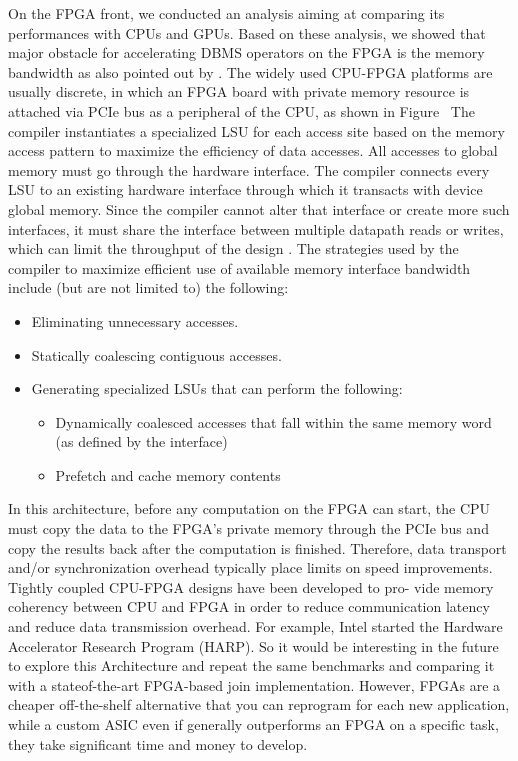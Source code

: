 \documentclass[sigconf, nonacm]{acmart}
\begin{document}
On the FPGA front, we conducted an analysis aiming at comparing its performances with CPUs and GPUs. Based on these analysis, we showed that major obstacle for accelerating DBMS operators on the FPGA is the memory bandwidth as also pointed out by \cite{Chen2020IsFU}. The widely used CPU-FPGA platforms are usually discrete, in which an FPGA board with private memory resource is attached via PCIe
bus as a peripheral of the CPU, as shown in Figure \
The compiler instantiates a specialized LSU for each access site based on the
memory access pattern to maximize the efficiency of data accesses.
All accesses to global memory must go through the hardware interface. The compiler
connects every LSU to an existing hardware interface through which it transacts with
device global memory. Since the compiler cannot alter that interface or create more
such interfaces, it must share the interface between multiple datapath reads or writes,
which can limit the throughput of the design \cite{fpga_optim}.
The strategies used by the compiler to
maximize efficient use of available memory interface bandwidth include (but are not
limited to) the following:
\begin{itemize}
    \item  Eliminating unnecessary accesses.
    \item Statically coalescing contiguous accesses.
    \item Generating specialized LSUs that can perform the following:
    \begin{itemize}
        \item Dynamically coalesced accesses that fall within the same memory word (as
defined by the interface)
\item Prefetch and cache memory contents
    \end{itemize}
\end{itemize}
In this architecture, before any computation on the FPGA can start, the CPU must copy the data to the FPGA's private memory through the PCIe bus and copy the results back after the computation is finished.
Therefore, data transport and/or synchronization overhead typically place limits on speed improvements.
Tightly coupled CPU-FPGA designs have been developed to pro-
vide memory coherency between CPU and FPGA in order to reduce
communication latency and reduce data transmission overhead. For
example, Intel started the Hardware Accelerator Research Program
(HARP)\cite{harp}. So it would be interesting in the future to explore this
Architecture and repeat the same benchmarks and comparing it with a stateof-the-art FPGA-based join implementation\cite{FPGAbasedMF}.
However, FPGAs are a cheaper off-the-shelf alternative that you can reprogram for each new application, while a custom ASIC even if generally outperforms an FPGA on a specific task, they take significant time and money to develop.




\end{document}
